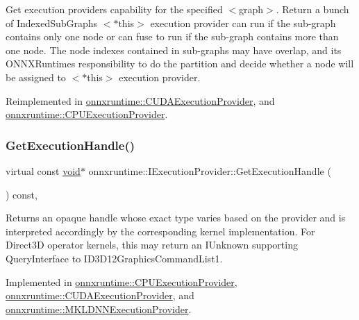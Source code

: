 Get execution provider\textquotesingle{}s capability for the specified $<$graph$>$. Return a bunch of Indexed\+Sub\+Graphs $<$$\ast$this$>$ execution provider can run if the sub-\/graph contains only one node or can fuse to run if the sub-\/graph contains more than one node. The node indexes contained in sub-\/graphs may have overlap, and it\textquotesingle{}s O\+N\+N\+X\+Runtime\textquotesingle{}s responsibility to do the partition and decide whether a node will be assigned to $<$$\ast$this$>$ execution provider. 

Reimplemented in \mbox{\hyperlink{classonnxruntime_1_1CUDAExecutionProvider_a1bb04dae34303befc1db6b487dc4c7c5}{onnxruntime\+::\+C\+U\+D\+A\+Execution\+Provider}}, and \mbox{\hyperlink{classonnxruntime_1_1CPUExecutionProvider_a5c6c0ee34c9768248d2bcb5f5b0aea70}{onnxruntime\+::\+C\+P\+U\+Execution\+Provider}}.

\mbox{\label{classonnxruntime_1_1IExecutionProvider_aebaeab04945539bc5db5942b63684ccb}} 
\subsubsection{\texorpdfstring{Get\+Execution\+Handle()}{GetExecutionHandle()}}
{\footnotesize\ttfamily virtual const \mbox{\hyperlink{mlasi_8h_a88f941d423cb2a819b70a1358982b1a6}{void}}$\ast$ onnxruntime\+::\+I\+Execution\+Provider\+::\+Get\+Execution\+Handle (\begin{DoxyParamCaption}{ }\end{DoxyParamCaption}) const\hspace{0.3cm}{\ttfamily [pure virtual]}, {\ttfamily [noexcept]}}

Returns an opaque handle whose exact type varies based on the provider and is interpreted accordingly by the corresponding kernel implementation. For Direct3D operator kernels, this may return an I\+Unknown supporting Query\+Interface to I\+D3\+D12\+Graphics\+Command\+List1. 

Implemented in \mbox{\hyperlink{classonnxruntime_1_1CPUExecutionProvider_a43c0400ad3529ffc272f5db39682e0f8}{onnxruntime\+::\+C\+P\+U\+Execution\+Provider}}, \mbox{\hyperlink{classonnxruntime_1_1CUDAExecutionProvider_a1cf09f277e0559c0e864fa6b0d39c898}{onnxruntime\+::\+C\+U\+D\+A\+Execution\+Provider}}, and \mbox{\hyperlink{classonnxruntime_1_1MKLDNNExecutionProvider_a8e47e298e1b0d6bd0b8bde10d6e1d7e4}{onnxruntime\+::\+M\+K\+L\+D\+N\+N\+Execution\+Provider}}.

